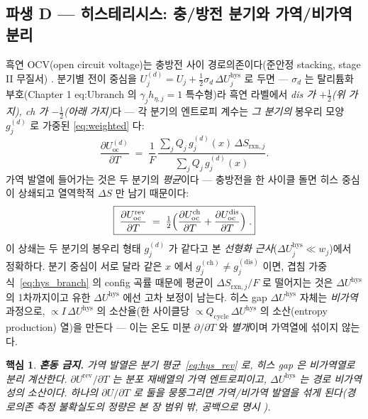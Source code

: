 \documentclass[11pt,a4paper]{article}
\newtheorem*{keybox}{핵심}
\newcommand{\rxn}{\mathrm{rxn}}
\newcommand{\rev}{\mathrm{rev}}
\newcommand{\oc}{\mathrm{oc}}
\newcommand{\hys}{\mathrm{hys}}
\begin{document}
\subsection{파생 D — 히스테리시스: 충/방전 분기와 가역/비가역 분리}\label{ssec:hys}
흑연 OCV(open circuit voltage)는 충방전 사이 경로의존이다(준안정 stacking, stage II 무질서) \cite{hysteresis2018}. 분기별 전이 중심을
$U_j^{(d)}=U_j+\tfrac12\sigma_d\,\Delta U_j^\hys$ 로 두면 — $\sigma_d$ 는 탈리튬화 부호(Chapter 1 eq:Ubranch 의
$\gamma_jh_{\eta,j}{=}1$ 특수형)라 흑연 라벨에서 \emph{dis 가 $+\tfrac12$(위 가지), ch 가 $-\tfrac12$(아래 가지)}다 —
각 분기의 엔트로피 계수는 \emph{그 분기의} 봉우리 모양 $g_j^{(d)}$ 로 가중된 \eqref{eq:weighted} 다:
\begin{equation}
\frac{\partial U_\oc^{(d)}}{\partial T}
\;=\;\frac1F\,\frac{\sum_j Q_j\,g_j^{(d)}(x)\,\Delta S_{\rxn,j}}{\sum_j Q_j\,g_j^{(d)}(x)}.
\label{eq:hys_branch}
\end{equation}
가역 발열에 들어가는 것은 두 분기의 \emph{평균}이다 — 충방전을 한 사이클 돌면 히스 중심이 상쇄되고 열역학적
$\Delta S$ 만 남기 때문이다:
\begin{equation}
\boxed{\;\frac{\partial U_\oc^\rev}{\partial T}
\;=\;\tfrac12\Bigl(\frac{\partial U_\oc^\mathrm{ch}}{\partial T}+\frac{\partial U_\oc^\mathrm{dis}}{\partial T}\Bigr)\;.}
\label{eq:hys_rev}
\end{equation}
이 상쇄는 두 분기의 봉우리 형태 $g_j^{(d)}$ 가 같다고 본 \emph{선형화 근사}($\Delta U_j^\hys\!\ll\!w_j$)에서 정확하다.
분기 중심이 서로 달라 같은 $x$ 에서 $g_j^{(\mathrm{ch})}\!\ne\!g_j^{(\mathrm{dis})}$ 이면, 겹침
가중식~\eqref{eq:hys_branch} 의 config 곡률 때문에 평균이 $\Delta S_{\rxn,j}/F$ 로 떨어지는 것은
$\Delta U^\hys$ 의 1차까지이고 유한 $\Delta U^\hys$ 에선 고차 보정이 남는다.
히스 gap $\Delta U^\hys$ 자체는 \emph{비가역} 과정으로, $\propto I\,\Delta U^\hys$ 의 소산율(한 사이클당
$\propto Q_\mathrm{cycle}\,\Delta U^\hys$ 의 소산(entropy production) 열)을 만든다 — 이는 온도 미분 $\partial/\partial T$ 와 \emph{별개}이며 가역열에 섞이지 않는다.
\begin{keybox}
\textbf{혼동 금지.} 가역 발열은 분기 평균~\eqref{eq:hys_rev} 로, 히스 gap 은 비가역열로 \emph{분리} 계산한다.
$\partial U^\rev/\partial T$ 는 분포 재배열의 가역 엔트로피이고, $\Delta U^\hys$ 는 경로 비가역성의 소산이다.
하나의 $\partial U/\partial T$ 로 둘을 뭉뚱그리면 가역/비가역 발열을 섞게 된다(경로의존 측정 불확실도의
정량은 본 장 범위 밖, 공백으로 명시 \cite{hysteresis2018}).
\end{keybox}
\end{document}
